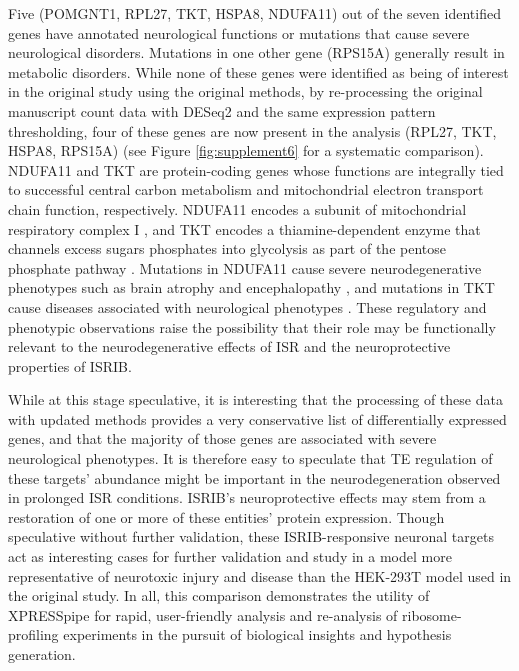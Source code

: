 \documentclass[10pt, oneside]{article}
\begin{document}
Five (POMGNT1, RPL27, TKT, HSPA8, NDUFA11) out of the seven identified genes have annotated neurological functions or mutations that cause severe neurological disorders. Mutations in one other gene (RPS15A) generally result in metabolic disorders. While none of these genes were identified as being of interest in the original study using the original methods, by re-processing the original manuscript count data with DESeq2 \cite{deseq2} and the same expression pattern thresholding, four of these genes are now present in the analysis (RPL27, TKT, HSPA8, RPS15A) (see Figure \ref{fig:supplement6} for a systematic comparison). NDUFA11 and TKT are protein-coding genes whose functions are integrally tied to successful central carbon metabolism and mitochondrial electron transport chain function, respectively. NDUFA11 encodes a subunit of mitochondrial respiratory complex I \cite{ndufa11}, and TKT encodes a thiamine-dependent enzyme that channels excess sugars phosphates into glycolysis as part of the pentose phosphate pathway \cite{tkt}. Mutations in NDUFA11 cause severe neurodegenerative phenotypes such as brain atrophy and encephalopathy \cite{ndufa11}, and mutations in TKT cause diseases associated with neurological phenotypes \cite{tkt_disease}. These regulatory and phenotypic observations raise the possibility that their role may be functionally relevant to the neurodegenerative effects of ISR and the neuroprotective properties of ISRIB.

While at this stage speculative, it is interesting that the processing of these data with updated methods provides a very conservative list of differentially expressed genes, and that the majority of those genes are associated with severe neurological phenotypes. It is therefore easy to speculate that TE regulation of these targets' abundance might be important in the neurodegeneration observed in prolonged ISR conditions. ISRIB's neuroprotective effects may stem from a restoration of one or more of these entities' protein expression. Though speculative without further validation, these ISRIB-responsive neuronal targets act as interesting cases for further validation and study in a model more representative of neurotoxic injury and disease than the HEK-293T model used in the original study. In all, this comparison demonstrates the utility of XPRESSpipe for rapid, user-friendly analysis and re-analysis of ribosome-profiling experiments in the pursuit of biological insights and hypothesis generation.\\
\end{document}
